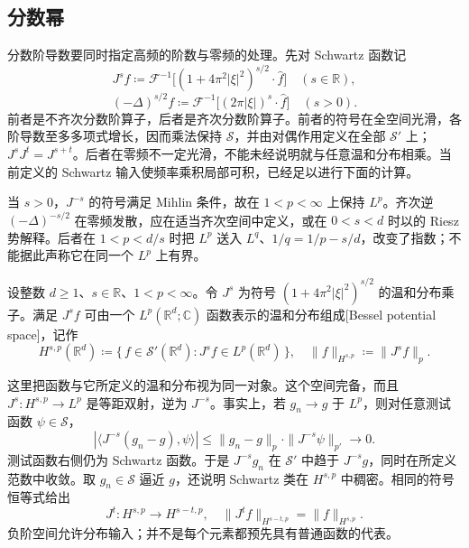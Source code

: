 \subsection{分数幂}
\label{b2:subsec:220302}

分数阶导数要同时指定高频的阶数与零频的处理。先对 Schwartz 函数记
\[
 J^sf\coloneqq\mathcal F^{-1}
       \bigl[(1+4\pi^2|\xi|^2)^{s/2}\cdot\widehat f\bigr]
 \quad(s\in\mathbb R),
\]
\[
 (-\Delta)^{s/2}f\coloneqq
 \mathcal F^{-1}\bigl[(2\pi|\xi|)^s\cdot\widehat f\bigr]
 \quad(s>0).
\]
前者是不齐次分数阶算子，后者是齐次分数阶算子。前者的符号在全空间光滑，各阶导数至多多项式增长，因而乘法保持 \(\mathcal S\)，并由对偶作用定义在全部 \(\mathcal S'\) 上；\(J^sJ^t=J^{s+t}\)。后者在零频不一定光滑，不能未经说明就与任意温和分布相乘。当前定义的 Schwartz 输入使频率乘积局部可积，已经足以进行下面的计算。

\ProseParagraphBreak

当 \(s>0\)，\(J^{-s}\) 的符号满足 Mihlin 条件，故在 \(1<p<\infty\) 上保持 \(L^p\)。齐次逆 \((-\Delta)^{-s/2}\) 在零频发散，应在适当齐次空间中定义，或在 \(0<s<d\) 时以的 Riesz 势解释。后者在 \(1<p<d/s\) 时把 \(L^p\) 送入 \(L^q\)、\(1/q=1/p-s/d\)，改变了指数；不能据此声称它在同一个 \(L^p\) 上有界。

\begin{definition}\label{b2:def:22-bessel-space}
设整数 \(d\geq1\)、\(s\in\mathbb R\)、\(1<p<\infty\)。令 \(J^s\) 为符号
\((1+4\pi^2|\xi|^2)^{s/2}\) 的温和分布乘子。满足 \(J^sf\) 可由一个 \(L^p(\mathbb R^d;\mathbb C)\) 函数表示的温和分布组成[Bessel potential space]，记作
\[
 H^{s,p}(\mathbb R^d)\coloneqq
 \{\,f\in\mathcal S'(\mathbb R^d):J^sf\in L^p(\mathbb R^d)\,\},
 \quad
 \|f\|_{H^{s,p}}\coloneqq\|J^sf\|_p.
\]
\end{definition}
这里把函数与它所定义的温和分布视为同一对象。这个空间完备，而且 \(J^s:H^{s,p}\to L^p\) 是等距双射，逆为 \(J^{-s}\)。事实上，若 \(g_n\to g\) 于 \(L^p\)，则对任意测试函数 \(\psi\in\mathcal S\)，
\[
 |\langle J^{-s}(g_n-g),\psi\rangle|
 \leq\|g_n-g\|_p\cdot\|J^{-s}\psi\|_{p'}
 \longrightarrow0.
\]
测试函数右侧仍为 Schwartz 函数。于是 \(J^{-s}g_n\) 在 \(\mathcal S'\) 中趋于 \(J^{-s}g\)，同时在所定义范数中收敛。取 \(g_n\in\mathcal S\) 逼近 \(g\)，还说明 Schwartz 类在 \(H^{s,p}\) 中稠密。相同的符号恒等式给出
\[
 J^t:H^{s,p}\longrightarrow H^{s-t,p},
 \quad \|J^tf\|_{H^{s-t,p}}=\|f\|_{H^{s,p}}.
\]
负阶空间允许分布输入；并不是每个元素都预先具有普通函数的代表。

